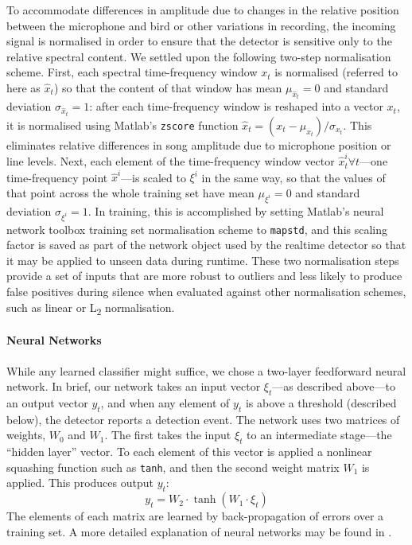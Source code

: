 \documentclass[10pt,letterpaper]{article}
\renewcommand{\subsubsection}[1]{\paragraph{#1}}
\begin{document}
To accommodate differences in amplitude due to changes in the relative position between the microphone and bird or other
variations in recording, the incoming signal is normalised in order to ensure that the 
detector is sensitive only to the relative spectral content.  We settled upon the following two-step normalisation scheme. First, each spectral time-frequency window $x_t$ is normalised (referred to here as $\hat{x}_t$) so that the content of that window has mean $\mu_{\hat{x}_t}=0$ and  standard deviation $\sigma_{\hat{x}_t}=1$: after each time-frequency window is reshaped into a vector $x_t$, it is normalised using Matlab's {\tt zscore} function $\hat{x}_t = (x_t - \mu_{x_t}) / \sigma_{x_t}$. This eliminates relative differences in song
amplitude due to microphone position or line levels. Next, each element of the time-frequency window vector $\hat{x}^i_t\forall t$---one time-frequency point $\hat{x}^{i}$---is scaled to $\xi^i$ in the same way, so that the values of that point across the whole training set have mean $\mu_{\xi^i}=0$ and standard deviation $\sigma_{\xi^i}=1$.  In training, this is accomplished by setting Matlab's neural network toolbox training set normalisation scheme to {\tt mapstd}, and this scaling factor is saved as part of the network object used by the realtime detector so that it may be applied to unseen data during runtime.
These two normalisation steps provide a set of inputs that are more
robust to outliers and less likely to produce false positives during 
silence when evaluated against other normalisation schemes, such as 
linear or L\textsubscript{2} normalisation.

\subsubsection{Neural Networks}

While any learned classifier might suffice, we chose a two-layer feedforward neural network.  In brief, our network takes an input vector $\xi_t$---as described above---to an output vector $y_t$, and when any element of $y_t$ is above a threshold (described below), the detector reports a detection event.  The network uses two matrices of weights, $W_0$ and $W_ 1$.  The first takes the input $\xi_t$ to an intermediate stage---the ``hidden layer'' vector.  To each element of this vector is applied a nonlinear squashing function such as {\tt tanh}, and then the second weight matrix $W_1$ is applied.  This produces output $y_t$:
\begin{equation*}
  y_t = W_2 \cdot \tanh (W_1 \cdot \xi_t)
\end{equation*}
The elements of each matrix are learned by back-propagation of errors over a training set.  A more detailed explanation of neural networks may be found in \cite{hkp}.
\end{document}
